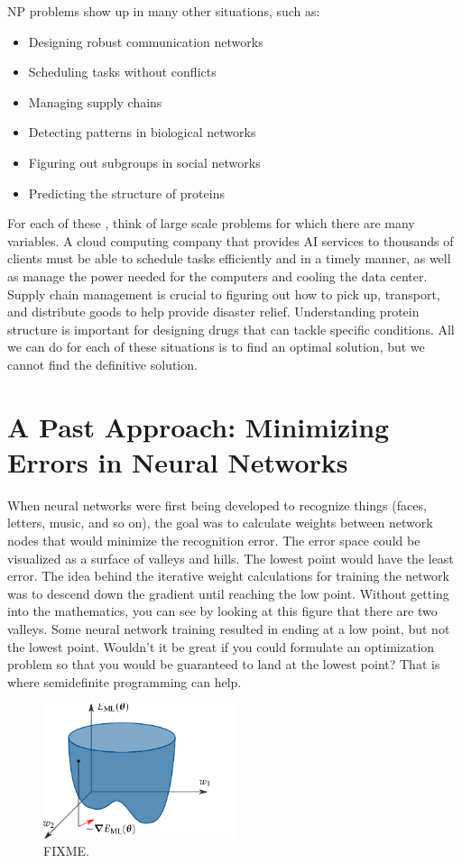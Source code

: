 NP problems show up in many other situations, such as:
\begin{itemize}
\item Designing  robust communication networks
\item Scheduling tasks without conflicts
\item Managing supply chains
\item Detecting patterns in biological networks
\item Figuring out subgroups in social networks
\item Predicting the structure of proteins
\end{itemize}

For each of these , think of large scale problems for which there are many variables. A cloud computing company that provides AI services to thousands of clients must be able to schedule tasks efficiently and in a timely manner, as well as manage the power needed for the computers and cooling the data center. Supply chain management is crucial to figuring out how to pick up, transport, and distribute goods to help provide disaster relief. Understanding protein structure is important for designing drugs that can tackle specific conditions. All we can do for each of these situations is to find an optimal solution, but we cannot find the definitive solution.

\section{A Past Approach: Minimizing Errors in Neural Networks}

When neural networks were first being developed to recognize things (faces, letters, music, and so on), the goal was to calculate weights between network nodes that would minimize the recognition error. The error space could be visualized as a surface of valleys and hills. The lowest point would have the least error. The idea behind the iterative weight calculations for training the network was to descend down the gradient until reaching the low point. Without getting into the mathematics, you can see by looking at this figure that there are two valleys. Some neural network training resulted in ending at a low point, but not the lowest point. Wouldn’t it be great if you could formulate an optimization problem so that you would be guaranteed to land at the lowest point? That is where semidefinite programming can help.

\begin{figure}[htbp]
    \centering
    \includegraphics[width=0.5\textwidth]{neuralnet-error-function.png}
    \caption{FIXME.}
    \label{fig:neuralnet-error}
\end{figure}

